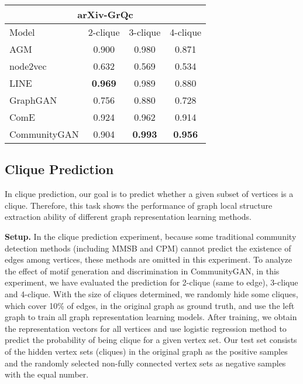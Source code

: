 \documentclass[sigconf]{acmart}
\newcommand{\ComGAN}{CommunityGAN}
\begin{document}
\begin{table}[tbp]
\begin{tabular}{cccc}
\\
\multicolumn{4}{c}{arXiv-GrQc}                                                                                                                       \\ \hline
\multicolumn{1}{|l|}{Model}        & \multicolumn{1}{c|}{2-clique}       & \multicolumn{1}{c|}{3-clique}       & \multicolumn{1}{c|}{4-clique}       \\ \hline \hline
\multicolumn{1}{|l|}{AGM}     & \multicolumn{1}{c|}{0.900}          & \multicolumn{1}{c|}{0.980}          & \multicolumn{1}{c|}{0.871}          \\ \hline
\multicolumn{1}{|l|}{node2vec}     & \multicolumn{1}{c|}{0.632}          & \multicolumn{1}{c|}{0.569}          & \multicolumn{1}{c|}{0.534}          \\ \hline
\multicolumn{1}{|l|}{LINE}         & \multicolumn{1}{c|}{\textbf{0.969}} & \multicolumn{1}{c|}{0.989}          & \multicolumn{1}{c|}{0.880}          \\ \hline
\multicolumn{1}{|l|}{GraphGAN}     & \multicolumn{1}{c|}{0.756}          & \multicolumn{1}{c|}{0.880}          & \multicolumn{1}{c|}{0.728}          \\ \hline
\multicolumn{1}{|l|}{ComE}         & \multicolumn{1}{c|}{0.924}          & \multicolumn{1}{c|}{0.962}          & \multicolumn{1}{c|}{0.914}          \\ \hline
\multicolumn{1}{|l|}{\ComGAN}      & \multicolumn{1}{c|}{0.904}          & \multicolumn{1}{c|}{\textbf{0.993}} & \multicolumn{1}{c|}{\textbf{0.956}} \\ \hline
\end{tabular}
\end{table}

\subsection{Clique Prediction}
In clique prediction, our goal is to predict whether a given subset of vertices is a clique.
Therefore, this task shows the performance of graph local structure extraction ability of different graph representation learning methods.

\vspace{5pt}\noindent\textbf{Setup.}
In the clique prediction experiment, because some traditional community detection methods (including MMSB and CPM) cannot predict the existence of edges among vertices, these methods are omitted in this experiment.
To analyze the effect of motif generation and discrimination in \ComGAN, in this experiment, we have evaluated the prediction for 2-clique (same to edge), 3-clique and 4-clique.
With the size of cliques determined, we randomly hide some cliques, which cover 10\% of edges, in the original graph as ground truth, and use the left graph to train all graph representation learning models.
After training, we obtain the representation vectors for all vertices and use logistic regression method to predict the probability of being clique for a given vertex set.
Our test set consists of the hidden vertex sets (cliques) in the original graph as the positive samples and the randomly selected non-fully connected vertex sets as negative samples with the equal number.
\end{document}
